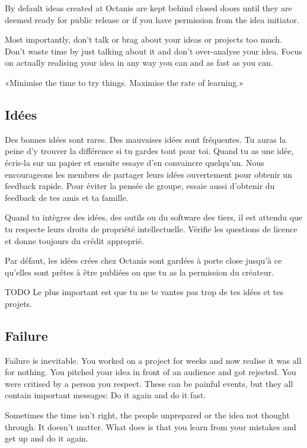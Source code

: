 	By default ideas created at Octanis are kept behind closed doors until they are deemed ready for public release or if you have permission from the idea initiator.

	Most importantly, don't talk or brag about your ideas or projects too much. Don't waste time by just talking about it and don't over-analyse your idea. Focus on actually realising your idea in any way you can and as fast as you can. 

	«Minimise the time to try things. Maximise the rate of learning.»





\french
	\subsection{Idées}
	Des bonnes idées sont rares. Des mauvaises idées sont fréquentes. Tu auras la peine d'y trouver la différence si tu gardes tout pour toi. 
	Quand tu as une idée, écris-la sur un papier et ensuite essaye d'en convaincre quelqu'un. Nous encourageons les membres de partager leurs idées ouvertement pour obtenir un feedback rapide. Pour éviter la pensée de groupe, essaie aussi d'obtenir du feedback de tes amis et ta famille. 

	Quand tu intègres des idées, des outils ou du software des tiers, il est attendu que tu respecte leurs droits de propriété intellectuelle. Vérifie les questions de licence et donne toujours du crédit approprié.

	Par défaut, les idées crées chez Octanis sont gardées à porte close jusqu'à ce qu'elles sont prêtes à être publiées ou que tu as la permission du créateur. 

	TODO Le plus important est que tu ne te vantes pas trop de tes idées et tes projets. 



\english
	\subsection{Failure}
	Failure is inevitable. You worked on a project for weeks and now realise it was all for nothing. You pitched your idea in front of an audience and got rejected. You were critised by a person you respect. 
	These can be painful events, but they all contain important messages: Do it again and do it fast.

	Sometimes the time isn't right, the people unprepared or the idea not thought through. It doesn't matter. What does is that you learn from your mistakes and get up and do it again. 



